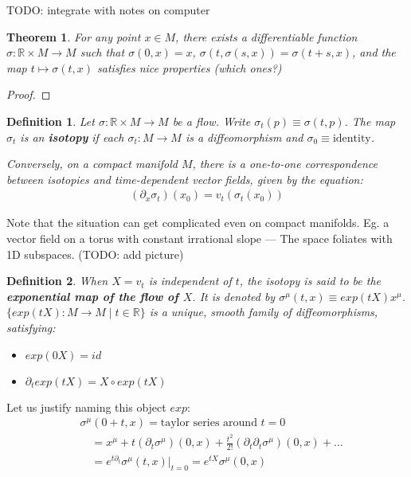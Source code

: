 \documentclass[11pt]{book}
\newcommand{\R}{\ensuremath{\mathbb R}}
\newtheorem{theorem}{Theorem}
\newtheorem{definition}{Definition}
\newtheorem{proof}{Proof}
\begin{document}
TODO: integrate with notes on computer

\begin{theorem}
    For any point $x \in M$, there exists a differentiable function $\sigma: \R \times M \rightarrow M$
    such that $\sigma(0, x) = x$, $\sigma(t, \sigma(s, x)) = \sigma(t + s, x)$,
    and the map $t \mapsto \sigma(t, x)$ satisfies nice properties (which ones?)
\end{theorem}
\begin{proof}
\end{proof}

\begin{definition}
    Let $\sigma: \R \times M \rightarrow M$ be a flow. Write $\sigma_t(p) \equiv \sigma(t, p)$.
    The map $\sigma_t$ is an \textbf{isotopy} if each $\sigma_t: M \rightarrow M$
    is a diffeomorphism and $\sigma_0 \equiv \text{identity}$.


    Conversely,  on a \emph{compact} manifold $M$, there is a one-to-one correspondence
    between isotopies and time-dependent vector fields, given by the equation:
    \begin{align*}
        (\partial_x \sigma_t)(x_0) = v_t(\sigma_t(x_0))
    \end{align*}
\end{definition}

Note that the situation can get complicated even on compact manifolds. Eg. a
vector field on a torus with constant irrational slope --- The space foliates
with 1D subspaces. (TODO: add picture)


\begin{definition}
    When $X = v_t$ is independent of $t$, the isotopy is said to be the
    \textbf{exponential map of the flow of $X$}. It is denoted by
    $\sigma^\mu(t, x) \equiv exp(tX) x^\mu$.
    $\{ exp(tX): M \rightarrow M \mid t \in \R \}$ is a unique,
    smooth family of diffeomorphisms, satisfying:
    \begin{itemize}
        \item $exp(0X) = id$
        \item $\partial_t exp(tX) = X \circ exp(tX)$
    \end{itemize}
\end{definition}

Let us justify naming this object $exp$:
\begin{align*}
    &\sigma^\mu(0 + t, x) = \text{taylor series around $t = 0$} \\
    &\quad = x^\mu + t (\partial_t \sigma^\mu)(0, x) + \frac{t^2}{2!} (\partial_t \partial_t \sigma^\mu)(0, x) + \dots \\
    &\quad = e^{t \partial_t} \sigma^\mu(t, x) |_{t=0} = e^{t X} \sigma^\mu(0, x)
\end{align*}
\end{document}
